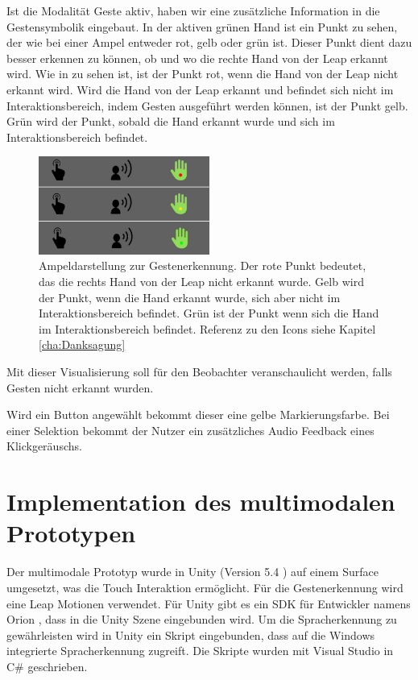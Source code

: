 Ist die Modalität Geste aktiv, haben wir eine zusätzliche Information in die Gestensymbolik eingebaut. 
In der aktiven grünen Hand ist ein Punkt zu sehen, der wie bei einer Ampel entweder rot, gelb oder grün ist. 
Dieser Punkt dient dazu besser erkennen zu können, ob und wo die rechte Hand von der Leap erkannt wird. 
Wie in  zu sehen ist, ist der Punkt rot, wenn die Hand von der Leap nicht erkannt wird. 
Wird die Hand von der Leap erkannt und befindet sich nicht im Interaktionsbereich, indem Gesten ausgeführt werden können, ist der Punkt gelb. Grün wird der Punkt, sobald die Hand erkannt wurde und sich im Interaktionsbereich befindet.
\begin{figure}[ht]
  \centering
  \includegraphics[width=0.5\textwidth]{img/Gestenerkennung.jpg}
  \caption[Ampeldarstellung zur Gestenerkennung]{Ampeldarstellung zur Gestenerkennung. Der rote Punkt bedeutet, das die rechts Hand von der Leap nicht erkannt wurde. 
	Gelb wird der Punkt, wenn die Hand erkannt wurde, sich aber nicht im Interaktionsbereich befindet. 
	Grün ist der Punkt wenn sich die Hand im Interaktionsbereich befindet. Referenz zu den Icons siehe Kapitel \ref{cha:Danksagung}}
  \label{fig:Ampeldarstellung}
\end{figure} 
Mit dieser Visualisierung soll für den Beobachter veranschaulicht werden, falls Gesten nicht erkannt wurden. 

Wird ein Button angewählt bekommt dieser eine gelbe Markierungsfarbe. 
Bei einer Selektion bekommt der Nutzer ein zusätzliches Audio Feedback eines Klickgeräuschs.

\section[Implementation]{Implementation des multimodalen Prototypen}
Der multimodale Prototyp wurde in Unity (Version 5.4 \citep{Unity}) auf einem Surface umgesetzt, was die Touch Interaktion ermöglicht. 
Für die Gestenerkennung wird eine Leap Motionen \citep{Leap} verwendet. 
Für Unity gibt es ein SDK für Entwickler namens Orion \citep{OrionBeta}, dass in die Unity Szene eingebunden wird. 
Um die Spracherkennung zu gewährleisten wird in Unity ein Skript eingebunden, dass auf die Windows integrierte Spracherkennung zugreift. 
Die Skripte wurden mit Visual Studio in C\# geschrieben.


